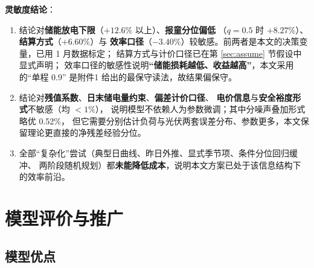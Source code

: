 \documentclass[12pt,a4paper,fontset=fandol]{ctexart}
\begin{document}
\textbf{灵敏度结论}\nobreak：
\begin{enumerate}[label=(\arabic*), leftmargin=2.4em, itemsep=1pt]
\item 结论对\textbf{储能放电下限}（$+12.6\text{\%}$ 以上\nobreak）\nobreak、\textbf{报童分位偏低}
（$q=0.5$ 时 $+8.27\text{\%}$\nobreak）\nobreak、\textbf{结算方式}（$+6.60\text{\%}$\nobreak）与
\textbf{效率口径}（$-3.40\text{\%}$\nobreak）较敏感\nobreak。前两者是本文的决策变量\nobreak，已用 1 月数据标定\nobreak；
结算方式与计价口径已在第 \ref{sec:assume} 节假设中显式声明\nobreak；
效率口径的敏感性说明\textbf{“储能损耗越低\nobreak、收益越高\nobreak”}\nobreak，本文采用的“单程 0.9\nobreak”
是附件1 给出的最保守读法\nobreak，故结果偏保守\nobreak。
\item 结论对\textbf{残值系数}\nobreak、\textbf{日末储电量约束}\nobreak、\textbf{偏差计价口径}\nobreak、
\textbf{电价信息}与\textbf{安全裕度形式}不敏感（均 $<1\text{\%}$\nobreak）\nobreak，
说明模型不依赖人为参数微调\nobreak；其中分噪声叠加形式略优 0.52\%\nobreak，
但它需要分别估计负荷与光伏两套误差分布\nobreak、参数更多\nobreak，本文保留理论更直接的净残差经验分位\nobreak。
\item 全部“复杂化\nobreak”尝试（典型日曲线\nobreak、昨日外推\nobreak、显式季节项\nobreak、条件分位回归缓冲\nobreak、
两阶段随机规划\nobreak）都\textbf{未能降低成本}\nobreak，说明本文方案已处于该信息结构下的效率前沿\nobreak。
\end{enumerate}


\section{模型评价与推广}

\subsection{模型优点}
\end{document}
